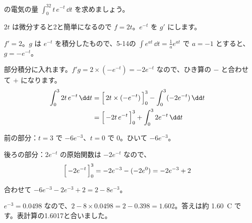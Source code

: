 \label{bk:5-16:kotae}\bkhatenaref の電気の量 $\displaystyle\int_0^32t\,e^{-t}\,\dd t$ を求めましょう。
\begin{enumerate}[label={\bkcircled[bkTheme]{\arabic*}}, leftmargin=2.4\zw, itemsep=2pt, topsep=2pt]
\item $2t$ は微分すると2と簡単になるので $f=2t$。$e^{-t}$ を $g'$ にします。
\item $f'=2$。$g$ は $e^{-t}$ を積分したもので、5-14の $\int e^{at}\,\dd t=\frac{1}{a}e^{at}$ で $a=-1$ とすると、$g=-e^{-t}$。
\item 部分積分に入れます。$f'g=2\times(-e^{-t})=-2e^{-t}$ なので、ひき算の $-$ と合わせて $+$ になります。
\begin{align*}
\int_0^32t\,e^{-t}\,\dd t&=\Bigl[\,2t\times(-e^{-t})\,\Bigr]_0^3-\int_0^3(-2e^{-t})\,\dd t\\
&=\Bigl[\,-2t\,e^{-t}\,\Bigr]_0^3+\int_0^32e^{-t}\,\dd t
\end{align*}
\item 前の部分：$t=3$ で $-6e^{-3}$、$t=0$ で $0$。ひいて $-6e^{-3}$。
\item 後ろの部分：$2e^{-t}$ の原始関数は $-2e^{-t}$ なので、
\[ \Bigl[\,-2e^{-t}\,\Bigr]_0^3=-2e^{-3}-(-2e^0)=-2e^{-3}+2 \]
\item 合わせて $-6e^{-3}-2e^{-3}+2=2-8e^{-3}$。
\end{enumerate}
$e^{-3}=0.0498$ なので、$2-8\times0.0498=2-0.398=1.602$。答えは約 \qty{1.60}{C} です。表計算の1.6017と合いました。


